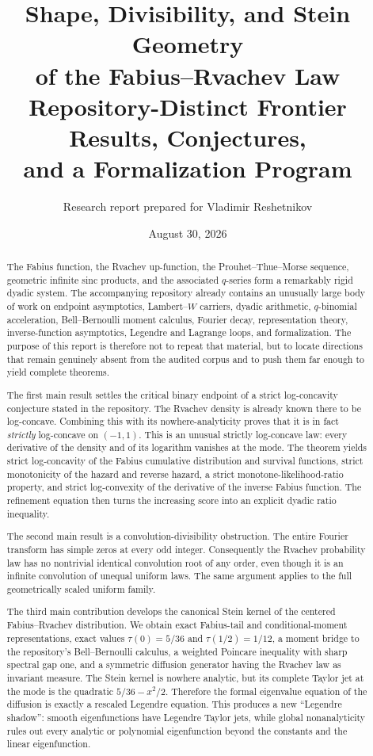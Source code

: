 \documentclass[11pt,oneside]{article}
\title{\Huge Shape, Divisibility, and Stein Geometry\\[0.4em]
       \Large of the Fabius--Rvachev Law\\[1em]
       \large Repository-Distinct Frontier Results, Conjectures,\\
       and a Formalization Program}
\author{Research report prepared for Vladimir Reshetnikov}
\date{August 30, 2026}
\theoremstyle{definition}
\theoremstyle{remark}
\begin{document}
\maketitle

\begin{abstract}
The Fabius function, the Rvachev up-function, the Prouhet--Thue--Morse sequence,
geometric infinite sinc products, and the associated $q$-series form a remarkably
rigid dyadic system.  The accompanying repository already contains an unusually
large body of work on endpoint asymptotics, Lambert--$W$ carriers, dyadic arithmetic,
$q$-binomial acceleration, Bell--Bernoulli moment calculus, Fourier decay,
representation theory, inverse-function asymptotics, Legendre and Lagrange loops,
and formalization.  The purpose of this report is therefore not to repeat that
material, but to locate directions that remain genuinely absent from the audited
corpus and to push them far enough to yield complete theorems.

The first main result settles the critical binary endpoint of a strict
log-concavity conjecture stated in the repository.  The Rvachev density is already
known there to be log-concave.  Combining this with its nowhere-analyticity proves
that it is in fact \emph{strictly} log-concave on $(-1,1)$.  This is an unusual
strictly log-concave law: every derivative of the density and of its logarithm
vanishes at the mode.  The theorem yields strict log-concavity of the Fabius
cumulative distribution and survival functions, strict monotonicity of the hazard
and reverse hazard, a strict monotone-likelihood-ratio property, and strict
log-convexity of the derivative of the inverse Fabius function.  The refinement
equation then turns the increasing score into an explicit dyadic ratio inequality.

The second main result is a convolution-divisibility obstruction.  The entire
Fourier transform has simple zeros at every odd integer.  Consequently the
Rvachev probability law has no nontrivial identical convolution root of any order,
even though it is an infinite convolution of unequal uniform laws.  The same
argument applies to the full geometrically scaled uniform family.

The third main contribution develops the canonical Stein kernel of the centered
Fabius--Rvachev distribution.  We obtain exact Fabius-tail and conditional-moment
representations, exact values $\tau(0)=5/36$ and $\tau(1/2)=1/12$, a moment bridge
to the repository's Bell--Bernoulli calculus, a weighted Poincare inequality with
sharp spectral gap one, and a symmetric diffusion generator having the Rvachev
law as invariant measure.  The Stein kernel is nowhere analytic, but its complete
Taylor jet at the mode is the quadratic $5/36-x^2/2$.  Therefore the formal
eigenvalue equation of the diffusion is exactly a rescaled Legendre equation.
This produces a new ``Legendre shadow'': smooth eigenfunctions have Legendre
Taylor jets, while global nonanalyticity rules out every analytic or polynomial
eigenfunction beyond the constants and the linear eigenfunction.


\end{abstract}
\end{document}
